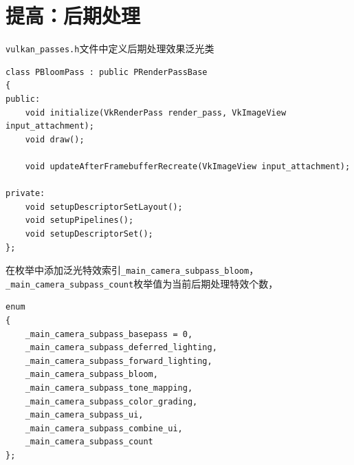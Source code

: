 \documentclass{ctexart}
\begin{document}
    \section{提高：后期处理}
    \verb|vulkan_passes.h|文件中定义后期处理效果泛光类
    \begin{verbatim}
class PBloomPass : public PRenderPassBase
{
public:
    void initialize(VkRenderPass render_pass, VkImageView input_attachment);
    void draw();

    void updateAfterFramebufferRecreate(VkImageView input_attachment);

private:
    void setupDescriptorSetLayout();
    void setupPipelines();
    void setupDescriptorSet();
};
    \end{verbatim}
    在枚举中添加泛光特效索引\verb|_main_camera_subpass_bloom|，\verb|_main_camera_subpass_count|枚举值为当前后期处理特效个数，
    \begin{verbatim}
enum
{
    _main_camera_subpass_basepass = 0,
    _main_camera_subpass_deferred_lighting,
    _main_camera_subpass_forward_lighting,
    _main_camera_subpass_bloom,
    _main_camera_subpass_tone_mapping,
    _main_camera_subpass_color_grading,
    _main_camera_subpass_ui,
    _main_camera_subpass_combine_ui,
    _main_camera_subpass_count
};
    \end{verbatim}
    
\end{document}

